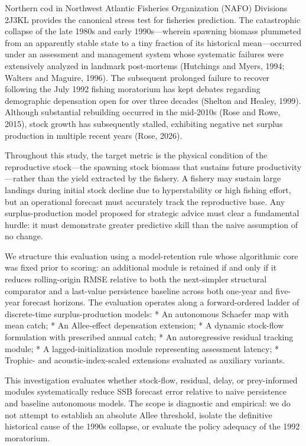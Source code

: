 \documentclass[11pt]{article}
\begin{document}
Northern cod in Northwest Atlantic Fisheries Organization (NAFO)
Divisions 2J3KL provides the canonical stress test for fisheries
prediction. The catastrophic collapse of the late 1980s and early
1990s---wherein spawning biomass plummeted from an apparently stable
state to a tiny fraction of its historical mean---occurred under an
assessment and management system whose systematic failures were
extensively analyzed in landmark post-mortems (Hutchings and Myers,
1994; Walters and Maguire, 1996). The subsequent prolonged failure to
recover following the July 1992 fishing moratorium has kept debates
regarding demographic depensation open for over three decades (Shelton
and Healey, 1999). Although substantial rebuilding occurred in the
mid-2010s (Rose and Rowe, 2015), stock growth has subsequently stalled,
exhibiting negative net surplus production in multiple recent years
(Rose, 2026).

Throughout this study, the target metric is the physical condition of
the reproductive stock---the spawning stock biomass that sustains future
productivity---rather than the yield extracted by the fishery. A fishery
may sustain large landings during initial stock decline due to
hyperstability or high fishing effort, but an operational forecast must
accurately track the reproductive base. Any surplus-production model
proposed for strategic advice must clear a fundamental hurdle: it must
demonstrate greater predictive skill than the naive assumption of no
change.

We structure this evaluation using a model-retention rule whose
algorithmic core was fixed prior to scoring: an additional module is
retained if and only if it reduces rolling-origin RMSE relative to both
the next-simpler structural comparator and a last-value persistence
baseline across both one-year and five-year forecast horizons. The
evaluation operates along a forward-ordered ladder of discrete-time
surplus-production models: * An autonomous Schaefer map with mean catch;
* An Allee-effect depensation extension; * A dynamic stock-flow
formulation with prescribed annual catch; * An autoregressive residual
tracking module; * A lagged-initialization module representing
assessment latency; * Trophic- and acoustic-index-scaled extensions
evaluated as auxiliary variants.

This investigation evaluates whether stock-flow, residual, delay, or
prey-informed modules systematically reduce SSB forecast error relative
to naive persistence and baseline autonomous models. The scope is
diagnostic and empirical: we do not attempt to establish an absolute
Allee threshold, isolate the definitive historical cause of the 1990s
collapse, or evaluate the policy adequacy of the 1992 moratorium.
\end{document}
